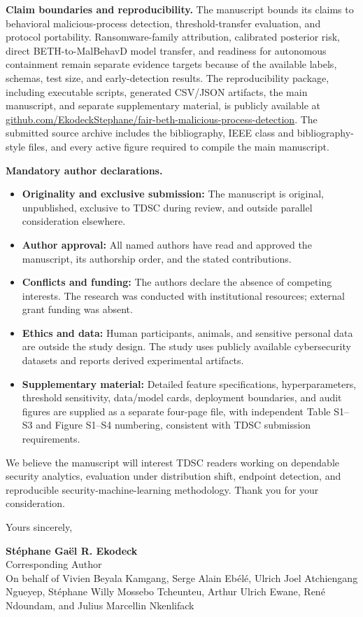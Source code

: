 \documentclass[11pt]{article}
\begin{document}
\textbf{Claim boundaries and reproducibility.}
The manuscript bounds its claims to behavioral malicious-process detection,
threshold-transfer evaluation, and protocol portability. Ransomware-family
attribution, calibrated posterior risk, direct BETH-to-MalBehavD model
transfer, and readiness for autonomous containment remain separate evidence
targets because of the available labels, schemas, test size, and
early-detection results. The reproducibility package,
including executable scripts, generated CSV/JSON artifacts, the main
manuscript, and separate supplementary material, is publicly available at
\href{https://github.com/EkodeckStephane/fair-beth-malicious-process-detection}
{github.com/EkodeckStephane/fair-beth-malicious-process-detection}. The
submitted source archive includes the bibliography, IEEE class and
bibliography-style files, and every active figure required to compile the
main manuscript.

\textbf{Mandatory author declarations.}
\begin{itemize}
    \item \textbf{Originality and exclusive submission:} The manuscript is
    original, unpublished, exclusive to TDSC during review, and outside
    parallel consideration elsewhere.
    \item \textbf{Author approval:} All named authors have read and approved
    the manuscript, its authorship order, and the stated contributions.
    \item \textbf{Conflicts and funding:} The authors declare the absence of
    competing interests. The research was conducted with institutional
    resources; external grant funding was absent.
    \item \textbf{Ethics and data:} Human participants, animals, and sensitive
    personal data are outside the study design. The study uses publicly
    available cybersecurity datasets and reports derived experimental artifacts.
    \item \textbf{Supplementary material:} Detailed feature specifications,
    hyperparameters, threshold sensitivity, data/model cards, deployment
    boundaries, and audit figures are supplied as a separate four-page file,
    with independent Table S1--S3 and Figure S1--S4 numbering, consistent with
    TDSC submission requirements.
\end{itemize}

We believe the manuscript will interest TDSC readers working on dependable
security analytics, evaluation under distribution shift, endpoint detection,
and reproducible security-machine-learning methodology. Thank you for your
consideration.

\vspace{4pt}
Yours sincerely,

\vspace{15pt}

\textbf{St\'{e}phane Ga\"{e}l R. Ekodeck}\\
Corresponding Author\\
On behalf of Vivien Beyala Kamgang, Serge Alain Eb\'{e}l\'{e}, Ulrich Joel
Atchiengang Ngueyep, St\'{e}phane Willy Mossebo Tcheunteu, Arthur Ulrich
Ewane, Ren\'{e} Ndoundam, and Julius Marcellin Nkenlifack
\end{document}
